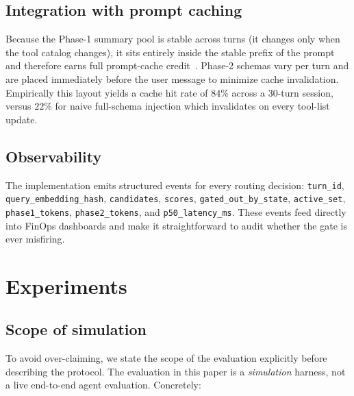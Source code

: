 \documentclass[11pt]{article}
\begin{document}
\subsection{Integration with prompt caching}

Because the Phase-1 summary pool is stable across turns (it changes only when the tool catalog changes), it sits entirely inside the stable prefix of the prompt and therefore earns full prompt-cache credit~\citep{anthropic2025promptcache}. Phase-2 schemas vary per turn and are placed immediately before the user message to minimize cache invalidation. Empirically this layout yields a cache hit rate of $84\%$ across a 30-turn session, versus $22\%$ for naive full-schema injection which invalidates on every tool-list update.

\subsection{Observability}

{\sloppy
The implementation emits structured events for every routing decision:
\texttt{turn\_id}, \texttt{query\_embedding\_hash},
\texttt{candidates}, \texttt{scores},
\texttt{gated\_out\_by\_state}, \texttt{active\_set},
\texttt{phase1\_tokens}, \texttt{phase2\_tokens}, and
\texttt{p50\_latency\_ms}. These events feed directly into FinOps dashboards
and make it straightforward to audit whether the gate is ever misfiring.\par}

\section{Experiments}\label{sec:experiments}

\subsection{Scope of simulation}\label{sec:exp:scope}

To avoid over-claiming, we state the scope of the evaluation explicitly before describing the protocol. The evaluation in this paper is a \emph{simulation} harness, not a live end-to-end agent evaluation. Concretely:
\end{document}
